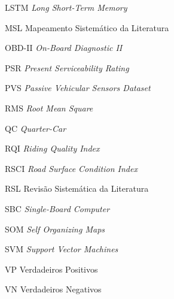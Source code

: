 \begin{siglas}
\item[LSTM] \textit{Long Short-Term Memory}
\item[MSL] Mapeamento Sistemático da Literatura
\item[OBD-II] \textit{On-Board Diagnostic II}
\item[PSR] \textit{Present Serviceability Rating}
\item[PVS] \textit{Passive  Vehicular  Sensors  Dataset}
\item[RMS] \textit{Root Mean Square}
\item[QC] \textit{Quarter-Car}
\item[RQI] \textit{Riding Quality Index}
\item[RSCI] \textit{Road Surface Condition Index}
\item[RSL] Revisão Sistemática da Literatura
\item[SBC] \textit{Single-Board  Computer}
\item[SOM] \textit{Self Organizing Maps}
\item[SVM] \textit{Support Vector Machines}
\item[VP] Verdadeiros Positivos
\item[VN] Verdadeiros Negativos
\end{siglas}
